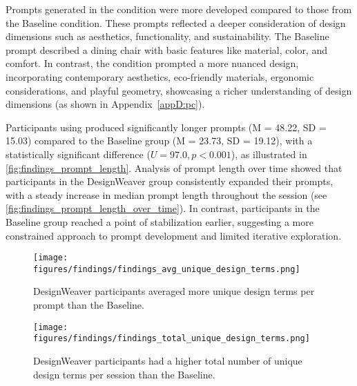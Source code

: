 Prompts generated in the \toolname{} condition were more developed compared to those from the Baseline condition. These prompts reflected a deeper consideration of design dimensions such as aesthetics, functionality, and sustainability. The Baseline prompt described a dining chair with basic features like material, color, and comfort. In contrast, the \toolname{} condition prompted a more nuanced design, incorporating contemporary aesthetics, eco-friendly materials, ergonomic considerations, and playful geometry, showcasing a richer understanding of design dimensions (as shown in Appendix~\ref{appD:pc}).

Participants using \toolname{} produced significantly longer prompts (M = 48.22, SD = 15.03) compared to the Baseline group (M = 23.73, SD = 19.12), with a statistically significant difference ($U = 97.0, p < 0.001$), as illustrated in \autoref{fig:findings_prompt_length}. Analysis of prompt length over time showed that participants in the DesignWeaver group consistently expanded their prompts, with a steady increase in median prompt length throughout the session (see \autoref{fig:findings_prompt_length_over_time}). In contrast, participants in the Baseline group reached a point of stabilization earlier, suggesting a more constrained approach to prompt development and limited iterative exploration. 

\begin{figure}[htbp]
    \centering
    \texttt{[image: figures/findings/findings\_avg\_unique\_design\_terms.png]}
    \caption{DesignWeaver participants averaged more unique design terms per prompt than the Baseline.}
    \label{fig:findings_avg_unique_design_terms}
\end{figure}

\begin{figure}[htbp]
    \centering
    \texttt{[image: figures/findings/findings\_total\_unique\_design\_terms.png]}
    \caption{DesignWeaver participants had a higher total number of unique design terms per session than the Baseline.}
    \label{fig:findings_total_unique_design_terms}
\end{figure}

